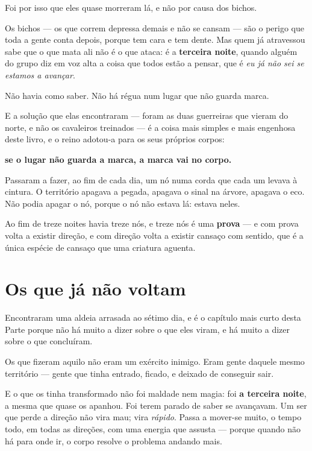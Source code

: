 \documentclass[livro.tex]{subfiles}
\begin{document}
\medskip

Foi por isso que eles quase morreram lá, e não por causa dos bichos.

Os bichos --- os que correm depressa demais e não se cansam --- são o perigo que toda a
gente conta depois, porque tem cara e tem dente. Mas quem já atravessou sabe que o que
mata ali não é o que ataca: é a \textbf{terceira noite}, quando alguém do grupo diz em voz
alta a coisa que todos estão a pensar, que é \emph{eu já não sei se estamos a avançar}.

Não havia como saber. Não há régua num lugar que não guarda marca.

\medskip

E a solução que elas encontraram --- foram as duas guerreiras que vieram do norte, e não
os cavaleiros treinados --- é a coisa mais simples e mais engenhosa deste livro, e o reino
adotou-a para os seus próprios corpos:

\textbf{se o lugar não guarda a marca, a marca vai no corpo.}

Passaram a fazer, ao fim de cada dia, um nó numa corda que cada um levava à cintura. O
território apagava a pegada, apagava o sinal na árvore, apagava o eco. Não podia apagar o
nó, porque o nó não estava lá: estava neles.

Ao fim de treze noites havia treze nós, e treze nós é uma \textbf{prova} --- e com prova
volta a existir direção, e com direção volta a existir cansaço com sentido, que é a única
espécie de cansaço que uma criatura aguenta.

\section{Os que já não voltam}

Encontraram uma aldeia arrasada ao sétimo dia, e é o capítulo mais curto desta Parte
porque não há muito a dizer sobre o que eles viram, e há muito a dizer sobre o que
concluíram.

Os que fizeram aquilo não eram um exército inimigo. Eram gente daquele mesmo território
--- gente que tinha entrado, ficado, e deixado de conseguir sair.

E o que os tinha transformado não foi maldade nem magia: foi \textbf{a terceira noite}, a
mesma que quase os apanhou. Foi terem parado de saber se avançavam. Um ser que perde a
direção não vira mau; vira \emph{rápido}. Passa a mover-se muito, o tempo todo, em todas
as direções, com uma energia que assusta --- porque quando não há para onde ir, o corpo
resolve o problema andando mais.
\end{document}

